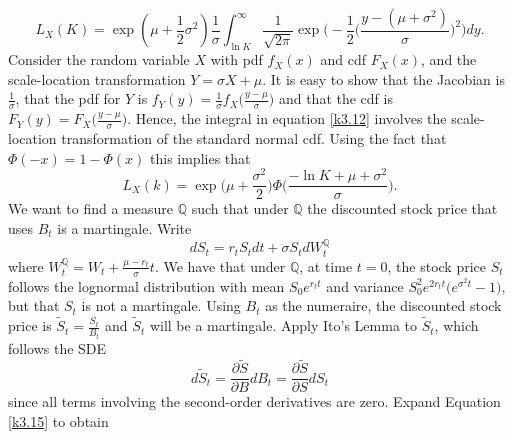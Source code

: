\documentclass[a4 paper, 12pt]{report}
\theoremstyle{plain}
\begin{document}
\begin{equation}\label{k3.12}
L_X(K) = \exp(\mu+\frac{1}{2}\sigma^2)\frac{1}{\sigma}\int_{\ln K}^\infty\frac{1}{\sqrt{2\pi}}\exp\bigg(-\frac{1}{2}\bigg(\frac{y-(\mu+\sigma^2)}{\sigma}\bigg)^2\bigg)dy.
\end{equation}
Consider the random variable $X$ with pdf $f_X(x)$ and cdf $F_X(x)$, and the scale-location transformation $Y = \sigma X+\mu$. It is easy to show that the Jacobian is $\frac{1}{\sigma}$, that the pdf for $Y$ is $f_Y(y) = \frac{1}{\sigma}f_X\bigg(\frac{y -\mu}{\sigma}\bigg)$ and that the cdf is $F_Y(y) = F_X\bigg(\frac{y-\mu}{\sigma}\bigg).$ Hence, the integral in equation \eqref{k3.12} involves the scale-location transformation of the standard normal cdf. Using the fact that $\Phi(-x) = 1- \Phi(x)$ this implies that
\begin{equation}\label{k3.13}
L_X(k) = \exp\bigg(\mu+\frac{\sigma^2}{2}\bigg)\Phi\bigg(\frac{-\ln K+\mu+\sigma^2}{\sigma}\bigg).
\end{equation}
We want to find a measure $\mathbb{Q}$ such that under $\mathbb{Q}$ the discounted stock price that uses $B_t$ is a martingale. Write
\begin{equation}\label{k3.14}
dS_t = r_tS_tdt+\sigma S_tdW_t^{\mathbb{Q}}
\end{equation}
where $W_t^\mathbb{Q} = W_t+\frac{\mu - r_t}{\sigma}t$. We have that under $\mathbb{Q}$, at time $t = 0$, the stock price $S_t$ follows the lognormal distribution with mean $S_0e^{r_tt}$ and variance $S_0^2e^{2r_tt}\bigg(e^{\sigma^2t} - 1\bigg),$ but that $S_t$ is not a martingale. Using $B_t$ as the numeraire, the discounted stock price is $\tilde{S}_t = \frac{S_t}{B_t}$ and $\tilde{S}_t$ will be a martingale. Apply Ito's Lemma to $\tilde{S}_t$, which follows the SDE
\begin{equation}\label{k3.15}
d\tilde{S}_t = \frac{\partial \tilde{S}}{\partial B}dB_t=\frac{\partial \tilde{S}}{\partial S}dS_t
\end{equation}
since all terms involving the second-order derivatives are zero. Expand Equation \eqref{k3.15} to obtain
\end{document}
